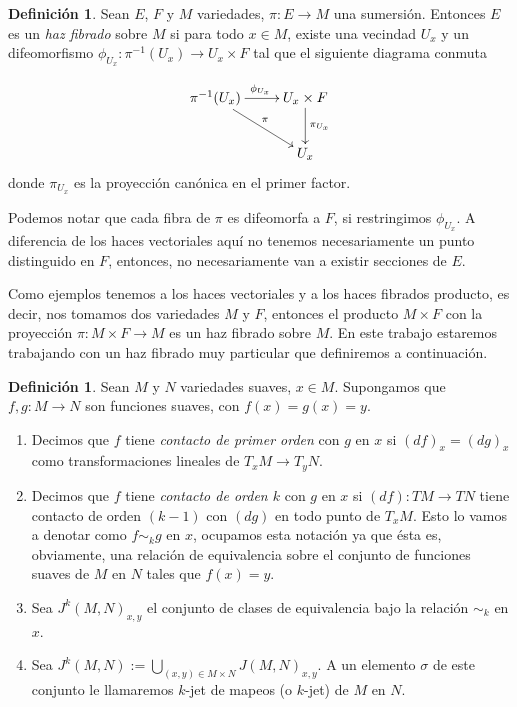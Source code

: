 \documentclass{report}
\theoremstyle{definition}
\newtheorem{defi}[theorem]{Definici\'on}
\begin{document}
\begin{defi}
Sean $E$, $F$ y $M$ variedades, $\pi: E \to M$ una sumersi\'on. Entonces $E$ es un \textit{haz fibrado} sobre $M$ si para todo $x \in M$, existe una vecindad $U_x$ y un difeomorfismo $\phi_{U_x}: \pi^{-1}(U_x) \to U_x \times F$ tal que el siguiente diagrama conmuta 

$$\xymatrix{
\pi^{-1} (U_x)  \ar[r]^{\phi_{U_x}} \ar[rd]^\pi &U_x \times F \ar[d]^{\pi_{U_x}}\\
 &U_x}$$ donde $\pi_{U_x}$ es la proyecci\'on can\'onica en el primer factor.
\end{defi}

Podemos notar que cada fibra de $\pi$ es difeomorfa a $F$, si restringimos $\phi_{U_x}$. A diferencia de los haces vectoriales aqu\'i no tenemos necesariamente un punto distinguido en $F$, entonces, no necesariamente van a existir secciones de $E$.

Como ejemplos tenemos a los haces vectoriales y a los haces fibrados producto, es decir, nos tomamos dos variedades $M$ y $F$, entonces el producto $M \times F$ con la proyecci\'on $\pi: M \times F \to M$ es un haz fibrado sobre $M$. En este trabajo estaremos trabajando con un haz fibrado muy particular que definiremos a continuaci\'on.

\begin{defi}
Sean $M$ y $N$ variedades suaves, $x \in M$. Supongamos que $f,g: M \to N$ son funciones suaves, con $f(x) = g(x) = y$.
\begin{enumerate}
\item Decimos que $f$ tiene \textit{contacto de primer orden} con $g$ en $x$ si $(df)_x = (dg)_x$ como transformaciones lineales de $T_x M \to T_y N$.
\item Decimos que $f$ tiene \textit{contacto de orden $k$} con $g$ en $x$ si $(df): TM \to TN$ tiene contacto de orden $(k-1)$ con $(dg)$ en todo punto de $T_x M$. Esto lo vamos a denotar como $f \sim_k g$ en $x$, ocupamos esta notaci\'on ya que \'esta es, obviamente, una relaci\'on de equivalencia sobre el conjunto de funciones suaves de $M$ en $N$ tales que $f(x) =y$.

\item Sea $J^k (M,N)_{x,y}$ el conjunto de clases de equivalencia bajo la relaci\'on $\sim_k$ en $x$. 

\item Sea $J^k (M,N) := \bigcup\limits_{ (x,y) \in M \times N} J(M,N)_{x,y}$. A un elemento $\sigma$ de este conjunto le llamaremos $k$-jet de mapeos (o $k$-jet) de $M$ en $N$.

\end{enumerate}


\end{defi}
\end{document}
